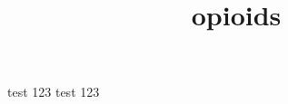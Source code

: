\documentclass[10pt]{article}
\begin{document}
\title{opioids }
\maketitle


test 123 test 123
\end{document}
